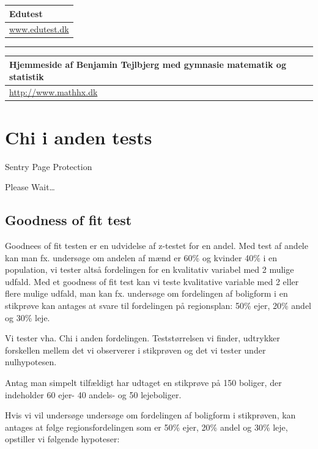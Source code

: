 \documentclass[]{book}
\begin{document}
\begin{longtable}[]{@{}l@{}}
\toprule
Edutest\tabularnewline
\midrule
\endhead
\href{http://www.edutest.dk}{www.edutest.dk}\tabularnewline
\bottomrule
\end{longtable}

\begin{center}\rule{0.5\linewidth}{\linethickness}\end{center}

\begin{longtable}[]{@{}l@{}}
\toprule
Hjemmeside af Benjamin Tejlbjerg med gymnasie matematik og statistik\tabularnewline
\midrule
\endhead
\href{http://www.mathhx.dk/?q=node/117}{http://www.mathhx.dk}\tabularnewline
\bottomrule
\end{longtable}

\hypertarget{chi-i-anden-tests}{%
\chapter{Chi i anden tests}\label{chi-i-anden-tests}}

\hypertarget{Sentry_noJS}{}
Sentry Page Protection

\hypertarget{Sentry_redirecting}{}
Please Wait\ldots{}

\hypertarget{goodness-of-fit-test}{%
\section{Goodness of fit test}\label{goodness-of-fit-test}}

Goodnees of fit testen er en udvidelse af z-testet for en andel. Med test af andele kan man fx. undersøge om andelen af mænd er 60\% og kvinder 40\% i en population, vi tester altså fordelingen for en kvalitativ variabel med 2 mulige udfald. Med et goodness of fit test kan vi teste kvalitative variable med 2 eller flere mulige udfald, man kan fx. undersøge om fordelingen af boligform i en stikprøve kan antages at svare til fordelingen på regionsplan: 50\% ejer, 20\% andel og 30\% leje.

Vi tester vha. Chi i anden fordelingen. Teststørrelsen vi finder, udtrykker forskellen mellem det vi observerer i stikprøven og det vi tester under nulhypotesen.

Antag man simpelt tilfældigt har udtaget en stikprøve på 150 boliger, der indeholder 60 ejer- 40 andels- og 50 lejeboliger.

Hvis vi vil undersøge undersøge om fordelingen af boligform i stikprøven, kan antages at følge regionsfordelingen som er 50\% ejer, 20\% andel og 30\% leje, opstiller vi følgende hypoteser:
\end{document}
